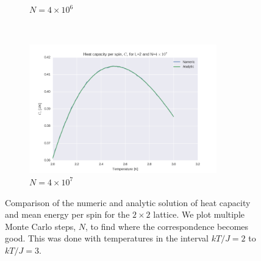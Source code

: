 \documentclass[a4paper, 10pt]{article}
\begin{document}
\begin{figure}[!ht]
\begin{subfigure}[H!]{0.5\textwidth}
        \caption{$N=4\times 10^6$}
    \end{subfigure}%
    ~ 
    \begin{subfigure}[H!]{0.5\textwidth}
        \centering
        \includegraphics[height=2.2in]{L2Cv4e7.png}
        \caption{$N=4\times 10^7$}
    \end{subfigure}
    \caption{Comparison of the numeric and analytic solution of heat capacity and mean energy per spin for the $2\times 2$ lattice. We plot multiple Monte Carlo steps, $N$, to find where the correspondence becomes good. This was done with temperatures in the interval $kT/J=2$ to $kT/J=3$.}\label{fig:2x2_nsteps}
\end{figure}
\end{document}

